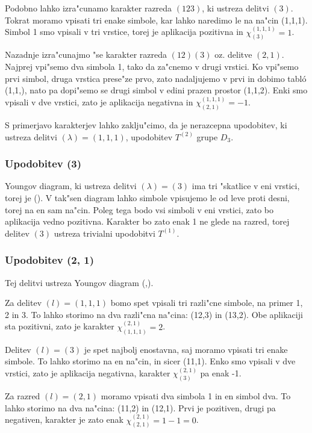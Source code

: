 \documentclass[a4paper,10pt]{article}
\begin{document}
 Podobno lahko izra"cunamo karakter razreda $(123)$, ki ustreza delitvi $(3)$. Tokrat moramo vpisati tri enake simbole, kar lahko naredimo le na na"cin \young(1,1,1). Simbol 1 smo vpisali v tri vrstice, torej je aplikacija pozitivna in $\chi^{(1,1,1)}_{(3)} = 1$.
 
 Nazadnje izra"cunajmo "se karakter razreda $(12)(3)$ oz. delitve $(2,1)$. Najprej vpi"semo dva simbola 1, tako da za"cnemo v drugi vrstici. Ko vpi"semo prvi simbol, druga vrstica prese"ze prvo, zato nadaljujemo v prvi in dobimo tabl\'o \young(1,1,\quad), nato pa dopi"semo se drugi simbol v edini prazen prostor \young(1,1,2). Enki smo vpisali v dve vrstici, zato je aplikacija negativna in $\chi^{(1,1,1)}_{(2,1)} = -1$. 
 
 S primerjavo karakterjev lahko zaklju"cimo, da je nerazcepna upodobitev, ki ustreza delitvi $(\lambda) = (1,1,1)$, upodobitev $T^{(2)}$ grupe $D_3$. 
 
 \subsubsection{Upodobitev (3)}
 
  Youngov diagram, ki ustreza delitvi $(\lambda) = (3)$ ima tri "skatlice v eni vrstici, torej je \young(\quad\quad\quad). V tak"sen diagram lahko simbole vpisujemo le od leve proti desni, torej na en sam na"cin. Poleg tega bodo vsi simboli v eni vrstici, zato bo aplikacija vedno pozitivna. Karakter bo zato enak 1 ne glede na razred, torej delitev $(3)$ ustreza trivialni upodobitvi $T^{(1)}$. 
  
\subsubsection{Upodobitev (2, 1)}

  Tej delitvi ustreza Youngov diagram \young(\quad\quad,\quad). 
  
  Za delitev $(l) = (1,1,1)$ bomo spet vpisali tri razli"cne simbole, na primer 1, 2 in 3. To lahko storimo na dva razli"cna na"cina: \young(12,3) in \young(13,2). Obe aplikaciji sta pozitivni, zato je karakter $\chi^{(2,1)}_{(1,1,1)} = 2$. 
  
  Delitev $(l) = (3)$ je spet najbolj enostavna, saj moramo vpisati tri enake simbole. To lahko storimo na en na"cin, in sicer \young(11,1). Enko smo vpisali v dve vrstici, zato je aplikacija negativna, karakter $\chi^{(2,1)}_{(3)}$ pa enak -1. 
  
  Za razred $(l) = (2,1)$ moramo vpisati dva simbola 1 in en simbol dva. To lahko storimo na dva na"cina: \young(11,2) in \young(12,1). Prvi je pozitiven, drugi pa negativen, karakter je zato enak  $\chi^{(2,1)}_{(2,1)} = 1 - 1 = 0$. 
  
\end{document}
